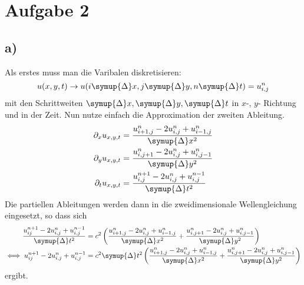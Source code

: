 \section{Aufgabe 2}
\subsection*{a)}
Als erstes muss man die Varibalen diskretisieren:
\begin{equation*}
    u(x,y,t) \to u(i \symup{\Delta}x, j\symup{\Delta}y, n \symup{\Delta}t) = u_{i,j}^n
\end{equation*}
mit den Schrittweiten $\symup{\Delta}x, \symup{\Delta}y, \symup{\Delta}t$ in $x$-, $y$- Richtung und in der Zeit.
Nun nutze einfach die Approximation der zweiten Ableitung.
\begin{align*}
    \partial_x u_{x,y,t} &= \frac{u_{i+1,j}^n -2 u_{i,j}^n + u_{i-1,j}^n }       {\symup{\Delta}x^2}\\
    \partial_y u_{x,y,t} &= \frac{u_{i,j+1}^n -2 u_{i,j}^n + u_{i,j-1}^n }       {\symup{\Delta}y^2}\\
    \partial_t u_{x,y,t} &= \frac{u_{i,j}^{n+1} -2 u_{i,j}^{n} + u_{i,j}^{n-1} }   {\symup{\Delta}t^2}
\end{align*}
Die partiellen Ableitungen werden dann in die zweidimensionale Wellengleichung eingesetzt, so dass sich 
\begin{align*}
    \frac{u_{ij}^{n+1} -2 u_{i,j}^{n} + u_{i,j}^{n-1} }   {\symup{\Delta}t^2} &= c^2
    \left ( \frac{u_{i+1,j}^n -2 u_{i,j}^n + u_{i-1,j}^n } {\symup{\Delta}x^2} + \frac{u_{i,j+1}^n -2 u_{i,j}^n + u_{i,j-1}^n } {\symup{\Delta}y^2} \right ) \\
    \iff u_{ij}^{n+1} -2 u_{i,j}^{n} + u_{i,j}^{n-1} &= 
    c^2 \symup{\Delta} t^2 \left ( \frac{u_{i+1,j}^n -2 u_{i,j}^n + u_{i-1,j}^n } {\symup{\Delta}x^2} + \frac{u_{i,j+1}^n -2 u_{i,j}^n + u_{i,j-1}^n } {\symup{\Delta}y^2} \right )
\end{align*}
ergibt.
